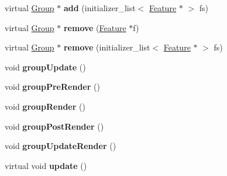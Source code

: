 \begin{DoxyCompactItemize}
\item 
\hypertarget{classj3d_1_1core_1_1Group_a4187ed9f65745b701395199a541b3da7}{}virtual \hyperlink{classj3d_1_1core_1_1Group}{Group} $\ast$ {\bfseries add} (initializer\+\_\+list$<$ \hyperlink{classj3d_1_1core_1_1Feature}{Feature} $\ast$ $>$ fs)\label{classj3d_1_1core_1_1Group_a4187ed9f65745b701395199a541b3da7}

\item 
\hypertarget{classj3d_1_1core_1_1Group_aeb2c3ce4c025ee94525cfc68298c6cfb}{}virtual \hyperlink{classj3d_1_1core_1_1Group}{Group} $\ast$ {\bfseries remove} (\hyperlink{classj3d_1_1core_1_1Feature}{Feature} $\ast$f)\label{classj3d_1_1core_1_1Group_aeb2c3ce4c025ee94525cfc68298c6cfb}

\item 
\hypertarget{classj3d_1_1core_1_1Group_a5511f04521462b18cf40a889240c9825}{}virtual \hyperlink{classj3d_1_1core_1_1Group}{Group} $\ast$ {\bfseries remove} (initializer\+\_\+list$<$ \hyperlink{classj3d_1_1core_1_1Feature}{Feature} $\ast$ $>$ fs)\label{classj3d_1_1core_1_1Group_a5511f04521462b18cf40a889240c9825}

\item 
\hypertarget{classj3d_1_1core_1_1Group_ac0806ba745f20e6dfe8d0dea1202ba1e}{}void {\bfseries group\+Update} ()\label{classj3d_1_1core_1_1Group_ac0806ba745f20e6dfe8d0dea1202ba1e}

\item 
\hypertarget{classj3d_1_1core_1_1Group_a51cccc2b24c1d6754e736cc65dd57e17}{}void {\bfseries group\+Pre\+Render} ()\label{classj3d_1_1core_1_1Group_a51cccc2b24c1d6754e736cc65dd57e17}

\item 
\hypertarget{classj3d_1_1core_1_1Group_a990276b13134f0e2c4a397d62662b3e9}{}void {\bfseries group\+Render} ()\label{classj3d_1_1core_1_1Group_a990276b13134f0e2c4a397d62662b3e9}

\item 
\hypertarget{classj3d_1_1core_1_1Group_a18ec2927a002fc9cce22695b20b8f364}{}void {\bfseries group\+Post\+Render} ()\label{classj3d_1_1core_1_1Group_a18ec2927a002fc9cce22695b20b8f364}

\item 
\hypertarget{classj3d_1_1core_1_1Group_a530bd8fa97850845828916997bf471fa}{}void {\bfseries group\+Update\+Render} ()\label{classj3d_1_1core_1_1Group_a530bd8fa97850845828916997bf471fa}

\item 
\hypertarget{classj3d_1_1core_1_1Group_a64ad0f9b90512cead51e2ec404aa82b1}{}virtual void {\bfseries update} ()\label{classj3d_1_1core_1_1Group_a64ad0f9b90512cead51e2ec404aa82b1}


\end{DoxyCompactItemize}
